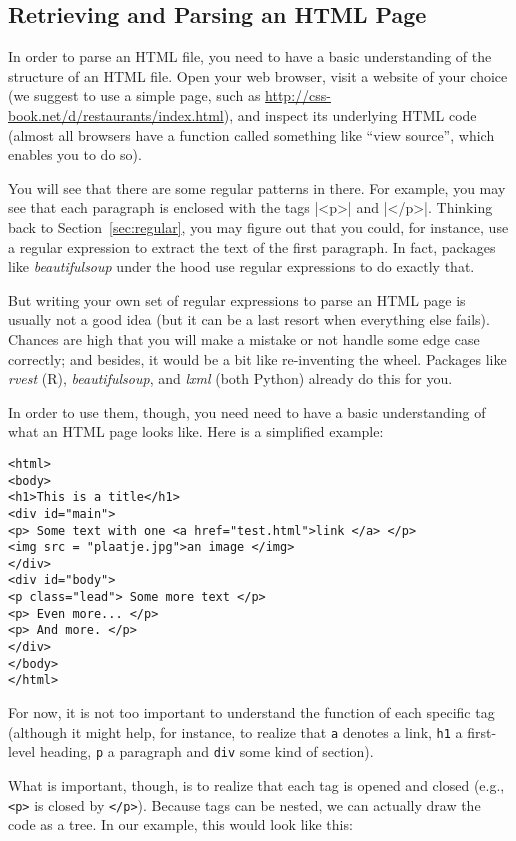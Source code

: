 \subsection{Retrieving and Parsing an HTML Page}
\label{sec:parsehtml}
In order to parse an HTML file, you need to have a basic understanding
of the structure of an HTML file. Open your web browser, visit a
website of your choice (we suggest to use a simple page, such as
\url{http://css-book.net/d/restaurants/index.html}), and
 inspect its underlying HTML code (almost all browsers have a
function called something like ``view source'', which enables you to
do so).

You will see that there are some regular patterns in there. For
example, you may see that each paragraph is enclosed with the tags
|<p>| and |</p>|. Thinking back to Section~\ref{sec:regular}, you may figure out 
that you could, for instance, use a regular expression to extract
the text of the first paragraph. In fact, packages like \emph{beautifulsoup}
under the hood use regular expressions to do exactly that.

But writing your own set of regular expressions to parse an HTML
page is usually not a good idea (but it can be a last resort when
everything else fails). Chances are high that you will make
a mistake or  not handle some edge case correctly; and besides,
it would be a bit like re-inventing the wheel. Packages like
\emph{rvest} (R), \emph{beautifulsoup}, and \emph{lxml} (both Python)
already do this for you.

In order to use them, though, you need need to have a basic
understanding of what an HTML page looks like. Here is a simplified
example:

\begin{lstlisting}
<html>
<body>
<h1>This is a title</h1>
<div id="main">
<p> Some text with one <a href="test.html">link </a> </p>
<img src = "plaatje.jpg">an image </img>
</div>
<div id="body">
<p class="lead"> Some more text </p>
<p> Even more... </p>
<p> And more. </p>
</div>
</body>
</html>
\end{lstlisting}

For now, it is not too important to understand the function of each
specific tag (although it might help, for instance, to realize that
\texttt{a} denotes a link, \texttt{h1} a first-level heading,
\texttt{p} a paragraph and \texttt{div} some kind of section).

What is important, though, is to realize that each tag is opened and
closed (e.g., \texttt{\small{<p>}} is closed by \texttt{\small{</p>}}).
Because tags can be nested, we can actually
draw the code as a tree. In our example, this would look like this:

